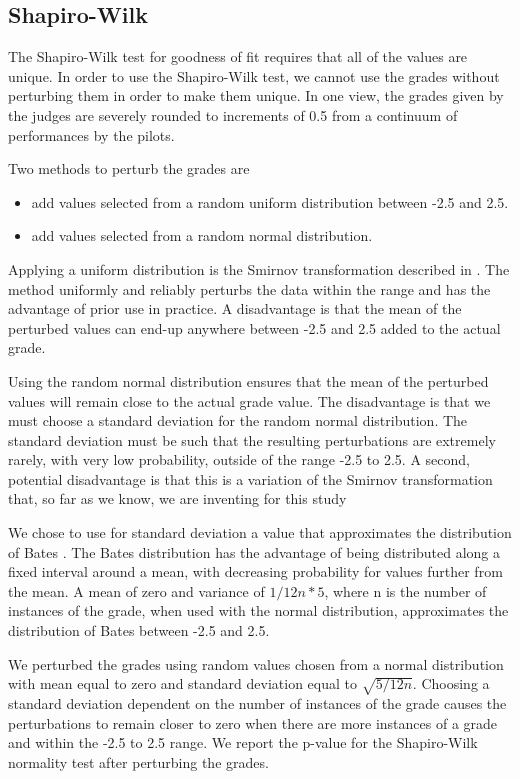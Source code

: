 \subsection{Shapiro-Wilk}

The Shapiro-Wilk test for goodness of fit requires that all of the values
are unique. In order to use the Shapiro-Wilk test, we
cannot use the grades without perturbing them in order to make them unique.
In one view, the grades given by the judges are severely rounded to increments
of 0.5 from a continuum of performances by the pilots.

Two methods to perturb the grades are
\begin{itemize}
\item add values selected from a random uniform distribution between -2.5 and
2.5.
\item add values selected from a random normal distribution.
\end{itemize}

Applying a uniform distribution is the Smirnov transformation described
in \cite{lemkol}.
The method uniformly and
reliably perturbs the data within the range and has the advantage of
prior use in practice. A disadvantage is that the mean
of the perturbed values can end-up anywhere between -2.5 and 2.5 added to
the actual grade.

Using the random normal distribution ensures that the mean of the perturbed
values will remain close to the actual grade value. The disadvantage is that
we must choose a standard deviation for the random normal distribution.
The standard deviation must be such that the resulting perturbations are
extremely rarely, with very low probability, outside of the range -2.5 to
2.5.  A second, potential disadvantage is that this is a variation of the
Smirnov transformation that, so far as we know,
we are inventing for this study

We chose to use for standard deviation a value that approximates the
distribution of Bates \cite{Bates}. The Bates distribution has the
advantage of being distributed along a fixed interval around a mean, with
decreasing probability for values further from the mean.
A mean of zero and variance of $1/12n * 5$,
where n is the number of instances of the grade, when used
with the normal distribution, approximates the distribution of Bates between
-2.5 and 2.5.

We perturbed the grades using random values chosen from a normal distribution
with mean equal to zero and standard deviation equal to $\sqrt{5/12n}$.
Choosing a standard deviation dependent on the number of instances
of the grade causes the perturbations to remain closer to zero when there
are more instances of a grade and within the -2.5 to 2.5 range.
We report the p-value for the Shapiro-Wilk normality test after perturbing
the grades.
